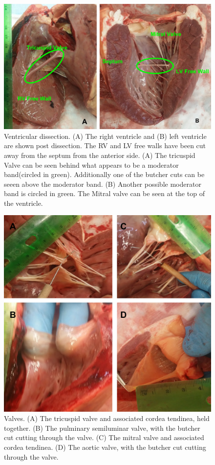 \documentclass[12pt]{article}
\begin{document}
\begin{figure}[H]
	
	\centering	
	\includegraphics[width = 1\textwidth]{Figures/Heart3.png}
	\caption{ Ventricular dissection. (A) The right ventricle and (B) left ventricle are shown post dissection. The RV and LV free walls have been cut away from the septum from the anterior side. (A) The tricuspid Valve can be seen behind what appears to be a moderator band(circled in green). Additionally one of the butcher cuts can be seeen above the moderator band. (B) Another possible moderator band is circled in green. The Mitral valve can be seen at the top of the ventricle. }
	\label{fig:H3}
\end{figure}
\begin{figure}[H]
	
	\centering	
	\includegraphics[width = 1\textwidth]{Figures/Heart4.png}
	\caption{ Valves. (A) The tricuspid valve and associated cordea tendinea, held together. (B) The pulminary semiluminar valve, with the butcher cut cutting through the valve. (C) The mitral valve and associated cordea tendinea. (D) The aortic valve, with the butcher cut cutting through the valve. }
	\label{fig:H4}
\end{figure}
\end{document}
